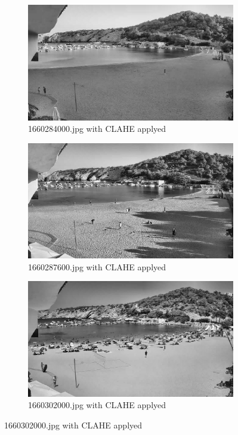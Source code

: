 \documentclass[10pt]{article}
\begin{document}
\begin{figure}[h]
    \centering %
\begin{subfigure}{0.25\textwidth}
  \includegraphics[width=\linewidth]{img/equ/1660284000.jpg}
  \caption{1660284000.jpg with CLAHE applyed}
  \label{fig:1}
\end{subfigure}\hfil %
\begin{subfigure}{0.25\textwidth}
  \includegraphics[width=\linewidth]{img/equ/1660287600.jpg}
  \caption{1660287600.jpg with CLAHE applyed}
  \label{fig:2}
\end{subfigure}\hfil %
\begin{subfigure}{0.25\textwidth}
  \includegraphics[width=\linewidth]{img/equ/1660302000.jpg}
  \caption{1660302000.jpg with CLAHE applyed}
  \label{fig:3}
\end{subfigure}


\end{figure}
\end{document}
